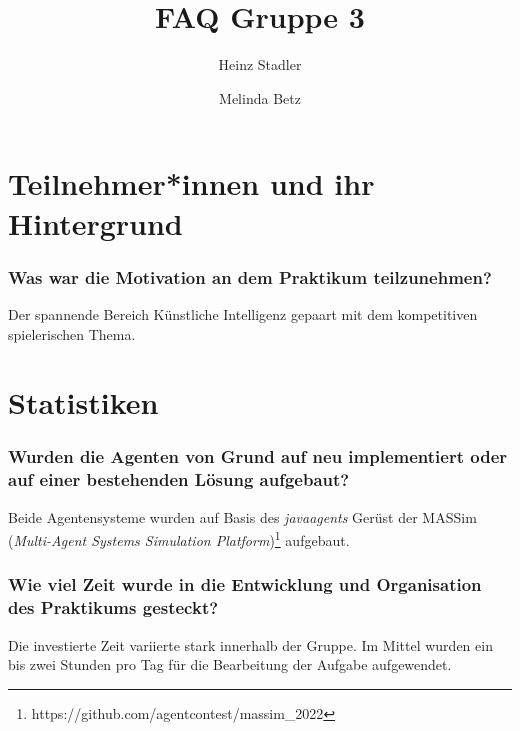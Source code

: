 \documentclass[runningheads]{llncs}
\begin{document}
	\title{FAQ Gruppe 3}
	\author{Heinz Stadler \and
		Melinda Betz}
	\maketitle              %
	
	\section{Teilnehmer*innen und ihr Hintergrund}
	\subsubsection{Was war die Motivation an dem Praktikum teilzunehmen?\\}
	Der spannende Bereich Künstliche Intelligenz gepaart mit dem kompetitiven spielerischen Thema.
	
	\section{Statistiken}
	\subsubsection{Wurden die Agenten von Grund auf neu implementiert oder auf einer bestehenden Lösung aufgebaut?\\}
	Beide Agentensysteme wurden auf Basis des \textit{javaagents} Gerüst der MASSim (\textit{Multi-Agent Systems Simulation Platform})\footnote{https://github.com/agentcontest/massim\_2022} aufgebaut.
	\subsubsection{Wie viel Zeit wurde in die Entwicklung und Organisation des Praktikums gesteckt?\\}
	Die investierte Zeit variierte stark innerhalb der Gruppe. Im Mittel wurden ein bis zwei Stunden pro Tag für die Bearbeitung der Aufgabe aufgewendet.
\end{document}
